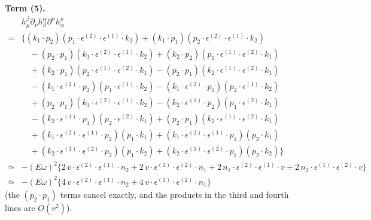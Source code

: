 \documentclass[12pt,a4paper,oneside]{article}
\numberwithin{equation}{section}   %
\begin{document}
\bigskip
\noindent\textbf{Term (5).}
\begin{align*}
&h_\mu^\beta\partial_\nu h_\beta^\alpha\partial^\mu h_\alpha^\nu\\
={}& \Big\{(k_1\!\cdot\!p_2)(p_1\!\cdot\!\epsilon^{(2)}\!\cdot\!\epsilon^{(1)}\!\cdot\! k_2)
+(k_1\!\cdot\!p_1)(p_2\!\cdot\!\epsilon^{(2)}\!\cdot\!\epsilon^{(1)}\!\cdot\! k_2)\\
&\quad-(p_2\!\cdot\!p_1)(k_1\!\cdot\!\epsilon^{(2)}\!\cdot\!\epsilon^{(1)}\!\cdot\! k_2)
+(k_2\!\cdot\!p_2)(p_1\!\cdot\!\epsilon^{(1)}\!\cdot\!\epsilon^{(2)}\!\cdot\! k_1)\\
&\quad+(k_2\!\cdot\!p_1)(p_2\!\cdot\!\epsilon^{(1)}\!\cdot\!\epsilon^{(2)}\!\cdot\! k_1)
-(p_2\!\cdot\!p_1)(k_2\!\cdot\!\epsilon^{(1)}\!\cdot\!\epsilon^{(2)}\!\cdot\! k_1) \\
&\quad -(k_1\!\cdot\!\epsilon^{(2)}\!\cdot\! p_2)(p_1\!\cdot\!\epsilon^{(1)}\!\cdot\! k_2)
-(k_1\!\cdot\!\epsilon^{(2)}\!\cdot\! p_1)(p_2\!\cdot\!\epsilon^{(1)}\!\cdot\! k_2)\\
&\quad+(p_2\!\cdot\!p_1)(k_1\!\cdot\!\epsilon^{(2)}\!\cdot\!\epsilon^{(1)}\!\cdot\! k_2)
-(k_2\!\cdot\!\epsilon^{(1)}\!\cdot\! p_2)(p_1\!\cdot\!\epsilon^{(2)}\!\cdot\! k_1)\\
&\quad-(k_2\!\cdot\!\epsilon^{(1)}\!\cdot\! p_1)(p_2\!\cdot\!\epsilon^{(2)}\!\cdot\! k_1)
+(p_2\!\cdot\!p_1)(k_2\!\cdot\!\epsilon^{(1)}\!\cdot\!\epsilon^{(2)}\!\cdot\! k_1) \\
&\quad +(k_1\!\cdot\!\epsilon^{(2)}\!\cdot\!\epsilon^{(1)}\!\cdot\! p_2)(p_1\!\cdot\!k_1)
+(k_1\!\cdot\!\epsilon^{(2)}\!\cdot\!\epsilon^{(1)}\!\cdot\! p_1)(p_2\!\cdot\!k_1)\\
&\quad +(k_2\!\cdot\!\epsilon^{(1)}\!\cdot\!\epsilon^{(2)}\!\cdot\! p_2)(p_1\!\cdot\!k_2)
+(k_2\!\cdot\!\epsilon^{(1)}\!\cdot\!\epsilon^{(2)}\!\cdot\! p_1)(p_2\!\cdot\!k_2)\Big\} \\[4pt]
\simeq{}& -(E\omega)^2\Big\{2\,v\!\cdot\!\epsilon^{(2)}\!\cdot\!\epsilon^{(1)}\!\cdot\! n_2
+2\,v\!\cdot\!\epsilon^{(1)}\!\cdot\!\epsilon^{(2)}\!\cdot\! n_1
+2\,n_1\!\cdot\!\epsilon^{(2)}\!\cdot\!\epsilon^{(1)}\!\cdot\! v
+2\,n_2\!\cdot\!\epsilon^{(1)}\!\cdot\!\epsilon^{(2)}\!\cdot\! v\Big\} \\[4pt]
\simeq{}& -(E\omega)^2\Big\{4\,v\!\cdot\!\epsilon^{(2)}\!\cdot\!\epsilon^{(1)}\!\cdot\! n_2
+4\,v\!\cdot\!\epsilon^{(1)}\!\cdot\!\epsilon^{(2)}\!\cdot\! n_1\Big\}
\end{align*}
(the $(p_2\!\cdot\!p_1)$ terms cancel exactly, and the products in the third and fourth lines are $O(v^2)$).
\end{document}
